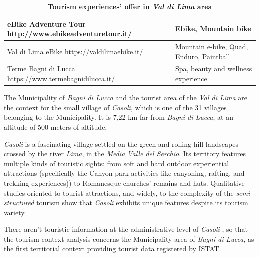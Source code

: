 \documentclass[sustainability,article,submit,pdftex,moreauthors]{Definitions/mdpi}
\begin{document}
\begin{table}
\begin{tabular}{|p{70mm}||p{45mm}|}
         \hline 
         eBike Adventure Tour \newline \url{http://www.ebikeadventuretour.it/}& Ebike, Mountain bike\\ \hline 
         Val di Lima eBike \newline  \url{https://valdilimaebike.it/} & Mountain e-bike, Quad, Enduro, Paintball\\
         \hline 
        Terme Bagni di Lucca \newline \url{https://www.termebagnidilucca.it/} &Spa, beauty and wellness experience\\
        \hline
    \end{tabular}
    \caption{\textbf{Tourism experiences’ offer in \emph{Val di Lima} area }}
    \label{tab:experience}
\end{table}

The Municipality of \emph{Bagni di Lucca} and the tourist area of the \emph{Val di Lima} are the context for the small village of \emph{Casoli}, which is one of the 31 villages belonging to the Municipality. It is 7,22 km far from \emph{Bagni di Lucca}, at an altitude of 500 meters of altitude.

\emph{Casoli} is a fascinating village settled on the green and rolling hill landscapes crossed by the river \emph{Lima}, in the \emph{Media Valle del Serchio}. Its territory features multiple kinds of touristic sights: from soft and hard outdoor experiential attractions (specifically the Canyon park activities like canyoning, rafting, and trekking experiences)) to Romanesque churches’ remains and huts.  Qualitative studies oriented to tourist attractions, and widely, to the complexity of the \emph{semi-structured} tourism show that \emph{Casoli} exhibits unique features despite its tourism variety.

There aren’t touristic information at the administrative level of \emph{Casoli} , so that the tourism context analysis concerns the Municipality area of \emph{Bagni di Lucca}, as the first territorial context providing tourist data registered by ISTAT.
\end{document}
